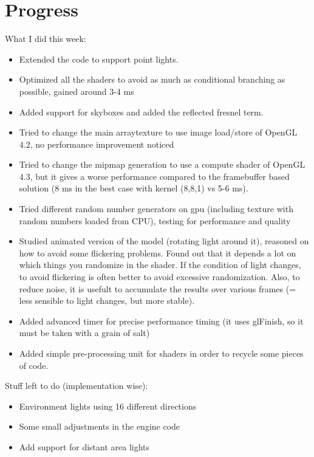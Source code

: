 \documentclass[12pt, twoside,a4paper]{article}
\begin{document}
\section{Progress}
What I did this week:
\begin{itemize}
	\item Extended the code to support point lights.
	\item Optimized all the shaders to avoid as much as conditional branching as possible, gained around 3-4 ms
	\item Added support for skyboxes and added the reflected fresnel term.	
	\item Tried to change the main arraytexture to use image load/store of OpenGL 4.2, no performance improvement noticed
	\item Tried to change the mipmap generation to use a compute shader of OpenGL 4.3, but it gives a worse performance compared to the framebuffer based solution (8 ms in the best case with kernel (8,8,1) vs 5-6 ms).
	\item Tried different random number generators on gpu (including texture with random numbers loaded from CPU), testing for performance and quality
	\item Studied animated version of the model (rotating light around it), reasoned on how to avoid some flickering problems. Found out that it depends a lot on which things you randomize in the shader. If the condition of light changes, to avoid flickering is often better to avoid excessive randomization. Also, to reduce noise, it is usefult to accumulate the results over various frames (= less sensible to light changes, but more stable).
	\item Added advanced timer for precise performance timing (it uses glFinish, so it must be taken with a grain of salt)
	\item Added simple pre-processing unit for shaders in order to recycle some pieces of code.
\end{itemize}

Stuff left to do (implementation wise):

\begin{itemize}
	\item Environment lights using 16 different directions
	\item Some small adjustments in the engine code
	\item Add support for distant area lights
\end{itemize}
\end{document}
